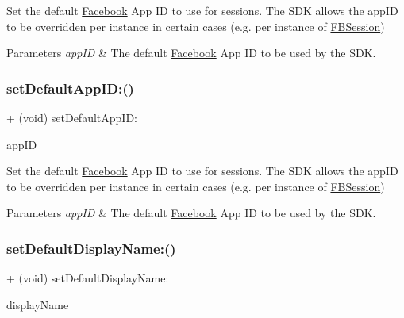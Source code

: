 Set the default \hyperlink{interfaceFacebook}{Facebook} App ID to use for sessions. The S\+DK allows the app\+ID to be overridden per instance in certain cases (e.\+g. per instance of \hyperlink{interfaceFBSession}{F\+B\+Session})


\begin{DoxyParams}{Parameters}
{\em app\+ID} & The default \hyperlink{interfaceFacebook}{Facebook} App ID to be used by the S\+DK. \\
\hline
\end{DoxyParams}
\mbox{\label{interfaceFBSettings_aae75641f83b1caf710efd2ce72b6eb67}} 
\subsubsection{\texorpdfstring{set\+Default\+App\+I\+D\+:()}{setDefaultAppID:()}\hspace{0.1cm}{\footnotesize\ttfamily [5/5]}}
{\footnotesize\ttfamily + (void) set\+Default\+App\+I\+D\+: \begin{DoxyParamCaption}\item[{(N\+S\+String $\ast$)}]{app\+ID }\end{DoxyParamCaption}}

Set the default \hyperlink{interfaceFacebook}{Facebook} App ID to use for sessions. The S\+DK allows the app\+ID to be overridden per instance in certain cases (e.\+g. per instance of \hyperlink{interfaceFBSession}{F\+B\+Session})


\begin{DoxyParams}{Parameters}
{\em app\+ID} & The default \hyperlink{interfaceFacebook}{Facebook} App ID to be used by the S\+DK. \\
\hline
\end{DoxyParams}
\mbox{\label{interfaceFBSettings_a783ff4cf8b998eadfbfe2d95efef24a1}} 
\subsubsection{\texorpdfstring{set\+Default\+Display\+Name\+:()}{setDefaultDisplayName:()}\hspace{0.1cm}{\footnotesize\ttfamily [1/5]}}
{\footnotesize\ttfamily + (void) set\+Default\+Display\+Name\+: \begin{DoxyParamCaption}\item[{(N\+S\+String $\ast$)}]{display\+Name }\end{DoxyParamCaption}}

